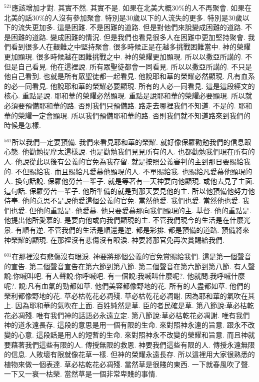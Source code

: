 \documentclass{book}
\begin{document}
$^{521}$應該增加才對.
其實不然.
其實不是.
如果在北美大概30\%的人不再聚會.
如果在北美的話30\%的人沒有參加聚會.
特別是30歲以下的人流失的更多.
特別是30歲以下的流失更加多.
這是困難.
不是困難的道路.
但是對他們來說變成困難的道路.
不是困難的道路.
變成困難的情況.
但是我們也看見很多人在困難中更加堅持聚會.
我們看到很多人在艱難之中堅持聚會.
很多時候正是在越多挑戰困難當中.
神的榮耀更加顯現.
很多時候越在困難挑戰之中.
神的榮耀更加顯現.
所以以撒亞所講的.
不但是自己看見.
他在這裡說.
所有眾聖徒都會一同看見.
所以以撒亞所講的.
不只是他自己看到.
也就是所有眾聖徒都一起看見.
他說耶和華的榮耀必然顯現.
凡有血系的必一同看見.
他說耶和華的榮耀必要顯現.
所有的人必一同看見.
這是這段經文的核心.
重點是說.
耶和華的榮耀必然顯現.
重點是說耶和華的榮耀必要顯現.
所以就必須要預備耶和華的路.
否則我們只預備路.
路走去哪裡我們不知道.
不是的.
耶和華的榮耀一定會顯現.
所以我們預備耶和華的路.
否則我們就不知道路來到我們的時候是怎樣.

$^{561}$所以我們一定要預備.
我們來看見耶和華的榮耀.
就好像保羅勸勉我們的信息跟心態.
他勸勉提摩太這樣說.
也是勸勉我們見見所有的人.
也都勸勉我們現在所有的人.
他說從此以後有公義的官免為我存留.
就是按照公義審判的主到那日要賜給我的.
不但賜給我.
而且賜給凡愛慕他顯現的人.
不單賜給我.
也賜給凡愛慕他顯現的人.
換句話說.
保羅他勞苦一輩子.
就是等著有一天神要向他顯現.
或他去見了主面.
這句話.
保羅勞苦一輩子.
他所準備的就是到那天要見他的主.
所以他預備他努力他侍奉.
他的意思不是說他愛這個公義的官免.
當然他愛.
我們也愛.
當然他也愛.
我們也愛.
但他的重點是.
他愛慕.
他只要愛慕那向我們顯現的主.
基督.
他的重點是.
他提出他所愛慕的.
是要向他或向我們顯現的主.
不管我們現今的生活是在什麼光景.
有順有逆.
不管我們的生活是順還是逆.
都是彩排.
都是預備的道路.
預備將來神榮耀的顯現.
在那裡沒有悲傷沒有眼淚.
神要將那官免再次賞賜給我們.

$^{601}$在那裡沒有悲傷沒有眼淚.
神要將那個公義的官免賞賜給我們.
這是第一個聲音的宣告.
第二個聲音宣告在第六節到第八節.
第二個聲音在第六節到第八節.
有人聲說:你喊叫吧.
有人聲說:你呼喊吧.
有一個說:我喊叫什麼呢?.
他就問:我呼喊什麼呢?.
說:凡有血氣的勁都如草.
他們美容都像野地的花.
所有的人盡都如草.
他們的榮利都像野地的花.
草必枯乾花必凋殘.
草必枯乾花必凋謝.
因為耶和華的氣吹在其上.
因為耶和華的氣吹在上面.
百姓純然是草.
臣的者民確是草.
第八節說:草必枯乾花必凋殘.
唯有我們神的話語必永遠立定.
第八節說:草必枯乾花必凋謝.
唯有我們神的道永遠長存.
這段的意思是用一個有限的生命.
來對照神永遠的旨意.
跟永不改變的心意.
這段話是用人的短暫的生命.
來對照神永不改變的榮耀和旨意.
而且神就要藉著我們這些有限的人.
傳授無限的救恩.
神要我們這些有限的人.
傳授永遠無限的信息.
人敗壞有限就像花草一樣.
但神的榮耀永遠長存.
所以這裡用大家很熟悉的植物來做一個表達.
草必枯乾花必凋殘.
當然草是很賤的東西.
一下就春風吹了聲.
一下又一衰一枯榮.
當然草是一個非常卑賤的事情.
\end{document}
